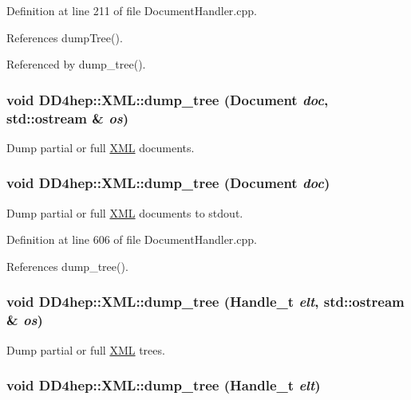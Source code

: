 Definition at line 211 of file DocumentHandler.cpp.

References dumpTree().

Referenced by dump\_\-tree().\hypertarget{namespace_d_d4hep_1_1_x_m_l_afd8062f9a152e74ef2dee123cf47433e}{
\subsubsection[{dump\_\-tree}]{\setlength{\rightskip}{0pt plus 5cm}void DD4hep::XML::dump\_\-tree (Document {\em doc}, \/  std::ostream \& {\em os})}}
\label{namespace_d_d4hep_1_1_x_m_l_afd8062f9a152e74ef2dee123cf47433e}


Dump partial or full \hyperlink{namespace_d_d4hep_1_1_x_m_l}{XML} documents. \hypertarget{namespace_d_d4hep_1_1_x_m_l_af7c204b171cd2ffe30308ce5ecdd5d44}{
\subsubsection[{dump\_\-tree}]{\setlength{\rightskip}{0pt plus 5cm}void DD4hep::XML::dump\_\-tree ({\bf Document} {\em doc})}}
\label{namespace_d_d4hep_1_1_x_m_l_af7c204b171cd2ffe30308ce5ecdd5d44}


Dump partial or full \hyperlink{namespace_d_d4hep_1_1_x_m_l}{XML} documents to stdout. 

Definition at line 606 of file DocumentHandler.cpp.

References dump\_\-tree().\hypertarget{namespace_d_d4hep_1_1_x_m_l_ad133b21bd1bc50d23e939ac03960341b}{
\subsubsection[{dump\_\-tree}]{\setlength{\rightskip}{0pt plus 5cm}void DD4hep::XML::dump\_\-tree (Handle\_\-t {\em elt}, \/  std::ostream \& {\em os})}}
\label{namespace_d_d4hep_1_1_x_m_l_ad133b21bd1bc50d23e939ac03960341b}


Dump partial or full \hyperlink{namespace_d_d4hep_1_1_x_m_l}{XML} trees. \hypertarget{namespace_d_d4hep_1_1_x_m_l_ab1004ab7c53f769743d8bd09c7891fd7}{
\subsubsection[{dump\_\-tree}]{\setlength{\rightskip}{0pt plus 5cm}void DD4hep::XML::dump\_\-tree ({\bf Handle\_\-t} {\em elt})}}
\label{namespace_d_d4hep_1_1_x_m_l_ab1004ab7c53f769743d8bd09c7891fd7}


